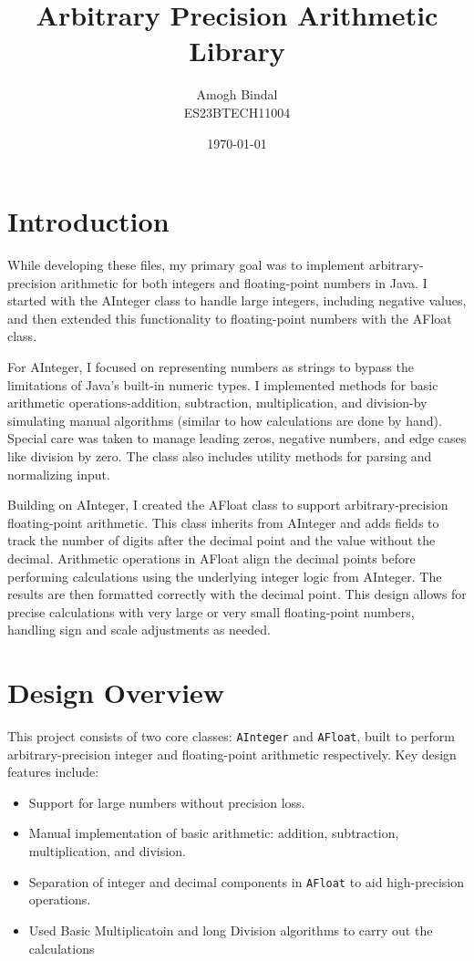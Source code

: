 \documentclass[12pt]{article}
\title{Arbitrary Precision Arithmetic Library}
\author{Amogh Bindal\\ ES23BTECH11004}
\date{\today}
\begin{document}
\maketitle

\section{Introduction}

While developing these files, my primary goal was to implement arbitrary-precision arithmetic for both integers and floating-point numbers in Java. I started with the AInteger class to handle large integers, including negative values, and then extended this functionality to floating-point numbers with the AFloat class.

For AInteger, I focused on representing numbers as strings to bypass the limitations of Java’s built-in numeric types. I implemented methods for basic arithmetic operations-addition, subtraction, multiplication, and division-by simulating manual algorithms (similar to how calculations are done by hand). Special care was taken to manage leading zeros, negative numbers, and edge cases like division by zero. The class also includes utility methods for parsing and normalizing input.

Building on AInteger, I created the AFloat class to support arbitrary-precision floating-point arithmetic. This class inherits from AInteger and adds fields to track the number of digits after the decimal point and the value without the decimal. Arithmetic operations in AFloat align the decimal points before performing calculations using the underlying integer logic from AInteger. The results are then formatted correctly with the decimal point. This design allows for precise calculations with very large or very small floating-point numbers, handling sign and scale adjustments as needed.

\section{Design Overview}
This project consists of two core classes: \texttt{AInteger} and \texttt{AFloat}, built to perform arbitrary-precision integer and floating-point arithmetic respectively. Key design features include:
\begin{itemize}
    \item Support for large numbers without precision loss.
    \item Manual implementation of basic arithmetic: addition, subtraction, multiplication, and division.
    \item Separation of integer and decimal components in \texttt{AFloat} to aid high-precision operations.
    \item Used Basic Multiplicatoin and long Division algorithms to carry out the calculations
\end{itemize}
\end{document}
